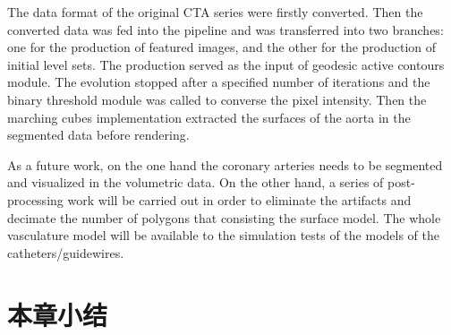 The data format of the original CTA series were firstly converted.
Then the converted data was fed into the pipeline and was transferred into two branches: one for the production of featured images, and the other for the production of initial level sets.
The production served as the input of geodesic active contours module.
The evolution stopped after a specified number of iterations and the binary threshold module was called to converse the pixel intensity.
Then the marching cubes implementation extracted the surfaces of the aorta in the segmented data before rendering.

As a future work, on the one hand the coronary arteries needs to be segmented and visualized in the volumetric data.
On the other hand, a series of post-processing work will be carried out in order to eliminate the artifacts and decimate the number of polygons that consisting the surface model.
The whole vasculature model will be available to the simulation tests of the models of the catheters/guidewires.


\section{本章小结} 